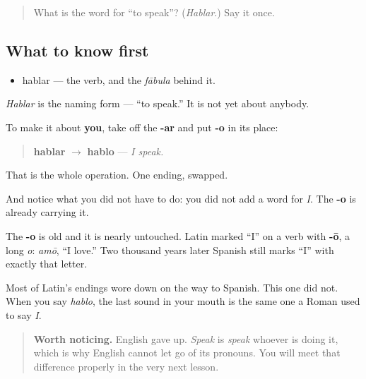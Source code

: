 \label{lesson:ES-C06-hablo}



\begin{quote}
What is the word for \textquotedblleft{}to speak\textquotedblright{}? (\emph{Hablar}.) Say it once.
\end{quote}

\subsection*{What to know first}
\begin{itemize}
\raggedright
  \item hablar — the verb, and the \emph{fābula} behind it.
\end{itemize}

\begin{grammarlens}[title={Grammar Lens: change the ending, change who is speaking}]
\emph{Hablar} is the naming form — \textquotedblleft{}to speak.\textquotedblright{} It is not yet about anybody.

To make it about \textbf{you}, take off the \textbf{-ar} and put \textbf{-o} in its place:

\begin{quote}
\textbf{hablar} $\to$ \textbf{hablo} — \emph{I speak.}
\end{quote}

That is the whole operation. One ending, swapped.

And notice what you did not have to do: you did not add a word for \emph{I}. The \textbf{-o} is already carrying it.
\end{grammarlens}

\begin{cousinweb}
The \textbf{-o} is old and it is nearly untouched. Latin marked \textquotedblleft{}I\textquotedblright{} on a verb with \textbf{-ō}, a long \emph{o}: \emph{amō}, \textquotedblleft{}I love.\textquotedblright{} Two thousand years later Spanish still marks \textquotedblleft{}I\textquotedblright{} with exactly that letter.

Most of Latin's endings wore down on the way to Spanish. This one did not. When you say \emph{hablo}, the last sound in your mouth is the same one a Roman used to say \emph{I}.

\begin{quote}
\textbf{Worth noticing.} English gave up. \emph{Speak} is \emph{speak} whoever is doing it, which is why English cannot let go of its pronouns. You will meet that difference properly in the very next lesson.
\end{quote}
\end{cousinweb}

